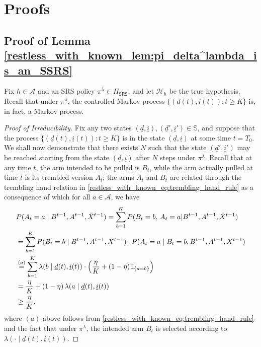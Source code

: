 \section{Proofs}
\label{restless_with_known_sec:proofs}
\subsection{Proof of Lemma \ref{restless_with_known_lem:pi_delta^lambda_is_an_SSRS}}\label{restless_with_known_appndx:proof_of_lemma_pi_delta^lambda_is_an_SSRS}
Fix $h\in\mathcal{A}$ and an SRS policy $\pi^\lambda\in\Pi_{\textsf{SRS}}$, and let $\mathcal{H}_h$ be the true hypothesis. Recall that under $\pi^\lambda$, the controlled Markov process  $\{(\underline{d}(t), \underline{i}(t)):t\geq K\}$ is, in fact, a Markov process.

\begin{proof}[Proof of Irreducibility]
	Fix any two states $(\underline{d},\underline{i}),(\underline{d}',\underline{i}')\in\mathbb{S}$, and suppose that the process $\{(\underline{d}(t), \underline{i}(t)):t\geq K\}$ is in the state $(\underline{d},\underline{i})$ at some time $t=T_0$. We shall now demonstrate that there exists $N$ such that the state $(\underline{d}',\underline{i}')$ may be reached starting from the state $(\underline{d},\underline{i})$ after $N$ steps under $\pi^\lambda$. Recall that at any time $t$, the arm intended to be pulled is $B_t$, while the arm actually pulled at time $t$ is its trembled version $A_t$; the arms $A_t$ and $B_t$ are related through the trembling hand relation in \eqref{restless_with_known_eq:trembling_hand_rule} as a consequence of which for all $a\in\mathcal{A}$, we have
	\begin{align}
		&P(A_t=a\mid B^{t-1},A^{t-1},\bar{X}^{t-1})=\sum\limits_{b=1}^{K}P(B_t=b,\,A_t=a|B^{t-1},A^{t-1},\bar{X}^{t-1})\nonumber\\
		&=\sum\limits_{b=1}^{K}P(B_t=b\mid B^{t-1},A^{t-1},\bar{X}^{t-1})\cdot P(A_t=a\mid B_t=b,B^{t-1},A^{t-1},\bar{X}^{t-1})\nonumber\\
		&\stackrel{(a)}{=}\sum\limits_{b=1}^{K}\lambda(b\mid\underline{d}(t),\underline{i}(t))\cdot \left(\frac{\eta}{K}+(1-\eta)\,\mathbb{I}_{\{a=b\}}\right)\nonumber\\
		&=\frac{\eta}{K}+(1-\eta)\,\lambda(a\mid\underline{d}(t),\underline{i}(t))\nonumber\\
		&\geq \frac{\eta}{K},\label{restless_with_known_eq:P(A_t=a|B_t=b,B^{t-1},A^{t-1},bar{X}^{t-1}}
	\end{align}
	where $(a)$ above follows from \eqref{restless_with_known_eq:trembling_hand_rule} and the fact that under $\pi^\lambda$, the intended arm $B_t$ is selected  according to $\lambda(\cdot\mid\underline{d}(t), \underline{i}(t))$. 
	

\end{proof}
